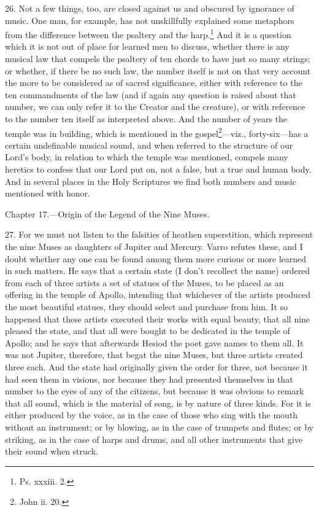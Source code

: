 26. Not a few things, too, are closed against us and obscured by ignorance of music. One man, for example, has not unskillfully explained some metaphors from the difference between the psaltery and the harp.\footnote{Ps. xxxiii. 2.} And it is a question which it is not out of place for learned men to discuss, whether there is any musical law that compels the psaltery of ten chords to have just so many strings; or whether, if there be no such law, the number itself is not on that very account the more to be considered as of sacred significance, either with reference to the ten commandments of the law (and if again any question is raised about that number, we can only refer it to the Creator and the creature), or with reference to the number ten itself as interpreted above. And the number of years the temple was in building, which is mentioned in the gospel\footnote{John ii. 20.}—viz., forty-six—has a certain undefinable musical sound, and when referred to the structure of our Lord’s body, in relation to which the temple was mentioned, compels many heretics to confess that our Lord put on, not a false, but a true and human body. And in several places in the Holy Scriptures we find both numbers and music mentioned with honor.


Chapter 17.—Origin of the Legend of the Nine Muses.

27. For we must not listen to the falsities of heathen superstition, which represent the nine Muses as daughters of Jupiter and Mercury. Varro refutes these, and I doubt whether any one can be found among them more curious or more learned in such matters. He says that a certain state (I don’t recollect the name) ordered from each of three artists a set of statues of the Muses, to be placed as an offering in the temple of Apollo, intending that whichever of the artists produced the most beautiful statues, they should select and purchase from him. It so happened that these artists executed their works with equal beauty, that all nine pleased the state, and that all were bought to be dedicated in the temple of Apollo; and he says that afterwards Hesiod the poet gave names to them all. It was not Jupiter, therefore, that begat the nine Muses, but three artists created three each. And the state had originally given the order for three, not because it had seen them in visions, nor because they had presented themselves in that number to the eyes of any of the citizens, but because it was obvious to remark that all sound, which is the material of song, is by nature of three kinds. For it is either produced by the voice, as in the case of those who sing with the mouth without an instrument; or by blowing, as in the case of trumpets and flutes; or by striking, as in the case of harps and drums, and all other instruments that give their sound when struck.

